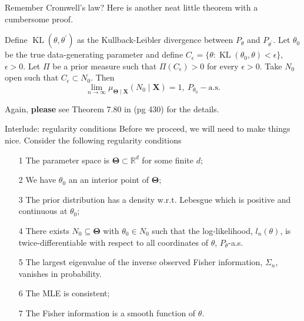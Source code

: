 \begin{frame}{Remember Cromwell's law?}
Here is another neat little theorem with a cumbersome proof.
\begin{theo}
Define $\operatorname{KL}(\theta, \theta^\prime)$ as the Kullback-Leibler divergence between $P_{\theta}$ and $P_{\theta^\prime}$.
Let $\theta_0$ be the true data-generating parameter and define $C_\epsilon = \{\theta : \operatorname{KL}(\theta_0, \theta) < \epsilon\}$, $\epsilon > 0$.
 Let $\Pi$ be a prior measure such that $\Pi(C_\epsilon) > 0$ for every $\epsilon > 0$.
 Take $N_0$ open such that $C_\epsilon \subset N_0$.
 Then 
 \begin{equation*}
  \lim_{n \to \infty} \mu_{\boldsymbol{\Theta} \mid \boldsymbol{X}}(N_0 \mid \boldsymbol{X}) = 1, \: P_{\theta_0}-\textrm{a.s.}
 \end{equation*}
\end{theo}
Again, \textbf{please} see Theorem 7.80 in \cite{Schervish1995} (pg 430) for the details.
\end{frame}
\begin{frame}[allowframebreaks]{Interlude: regularity conditions}
Before we proceed, we will need to make things nice.
Consider the following regularity conditions
\begin{itemize}
 \item[1] The parameter space is $\boldsymbol{\Theta} \subset \mathbb{R}^d$ for some finite $d$;
 \item[2] We have $\theta_0$ an an interior point of $\boldsymbol{\Theta}$;
 \item[3] The prior distribution has a density w.r.t. Lebesgue which is positive and continuous at $\theta_0$;
 \item[4] There exists $N_0 \subseteq \boldsymbol{\Theta}$ with $\theta_0 \in N_0$ such that the log-likelihood, $l_n(\theta)$, is twice-differentiable with respect to all coordinates of $\theta$, $P_{\theta}$-a.s.
 \item[5] The largest eigenvalue of the inverse observed Fisher information, $\Sigma_n$, vanishes in probability.
 \item[6] The MLE is consistent;
 \item[7] The Fisher information is a smooth function of $\theta$.
\end{itemize}

\end{frame}
